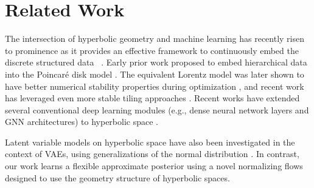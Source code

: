 \section{Related Work}
The intersection of hyperbolic geometry and machine learning has recently risen to prominence \cite{dhingra2018embedding,tay2018hyperbolic,law2019lorentzian,khrulkov2019hyperbolic} as it provides an effective framework to continuously embed the discrete structured data ~\cite{krioukov2010hyperbolic}. Early prior work proposed to embed hierarchical data into the Poincar\'e disk model \cite{nickel2017poincare,chamberlain2017neural}.
The equivalent Lorentz model was later shown to have better numerical stability properties during optimization \cite{nickel2018learning}, and recent work has leveraged even more stable tiling approaches \cite{yu2019numerically}. 
Recent works have extended several conventional deep learning modules (e.g., dense neural network layers and GNN architectures) to hyperbolic space \cite{gulcehre2018hyperbolic,ganea2018hyperbolic,liu2019graph,chami2019hyperbolic}.

Latent variable models on hyperbolic space have also been investigated in the context of VAEs, using  generalizations of the normal distribution \cite{nagano2019wrapped,mathieu2019continuous}. In contrast, our work learns a flexible approximate posterior using a novel normalizing flows designed to use the geometry structure of hyperbolic spaces.

